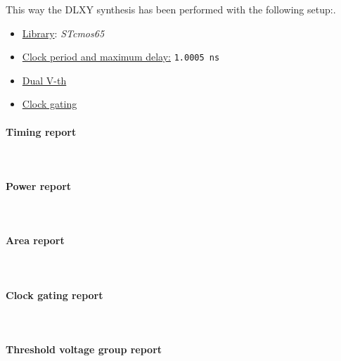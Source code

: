 \bigskip
This way the DLXY synthesis has been performed with the following setup:.
\begin{itemize}
	\item \underline{Library}: \textit{STcmos65}
	\item \underline{Clock period and maximum delay:} \texttt{1.0005 ns}
	\item \underline{Dual V-th}
	\item \underline{Clock gating}
\end{itemize}

\paragraph{Timing report} \mbox{} \\

\paragraph{Power report} \mbox{} \\

\paragraph{Area report} \mbox{} \\

\paragraph{Clock gating report} \mbox{} \\

\paragraph{Threshold voltage group report} \mbox{} \\


